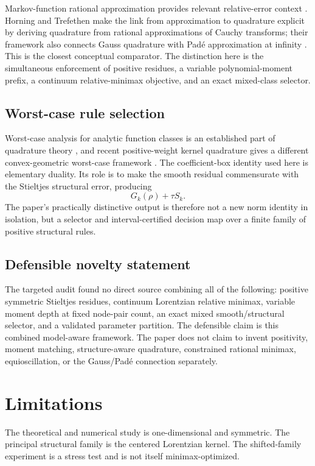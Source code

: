 \documentclass[preprint,12pt]{elsarticle}
\theoremstyle{remark}
\begin{document}
Markov-function rational approximation provides relevant relative-error
context \cite{beckermann2021}. Horning and Trefethen make the link from
approximation to quadrature explicit by deriving quadrature
from rational approximations of Cauchy transforms; their framework also
connects Gauss quadrature with Pad\'e approximation at infinity
\cite{horning2025}. This is the closest conceptual comparator. The
distinction here is the simultaneous enforcement of positive residues,
a variable polynomial-moment prefix, a continuum relative-minimax
objective, and an exact mixed-class selector.

\subsection{Worst-case rule selection}

Worst-case analysis for analytic function classes is an established
part of quadrature theory \cite{trefethen2022,goda2024}, and recent
positive-weight kernel quadrature gives a different
convex-geometric worst-case framework \cite{hayakawa2026}. The
coefficient-box identity used here is elementary duality. Its role is
to make the smooth residual commensurate with the Stieltjes structural
error, producing
\[
G_k(\rho)+\tau S_k.
\]
The paper's practically distinctive output is therefore not a new norm
identity in isolation, but a selector and interval-certified decision map over a
finite family of positive structural rules.

\subsection{Defensible novelty statement}

The targeted audit found no direct source combining all of the
following: positive symmetric Stieltjes residues, continuum Lorentzian
relative minimax, variable moment depth at fixed node-pair count, an
exact mixed smooth/structural selector, and a validated parameter
partition. The defensible claim is this combined model-aware framework.
The paper does not claim to invent positivity, moment matching,
structure-aware quadrature, constrained rational minimax,
equioscillation, or the Gauss/Pad\'e connection separately.

\section{Limitations}

The theoretical and numerical study is one-dimensional and symmetric.
The principal structural family is the centered Lorentzian kernel. The
shifted-family experiment is a stress test and is not itself
minimax-optimized.
\end{document}
